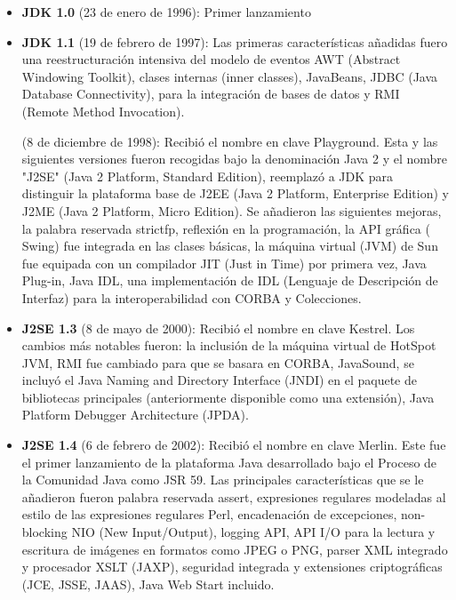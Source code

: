 \begin{itemize}

	\item \textbf{JDK 1.0}  (23 de enero de 1996): Primer lanzamiento
	
	\item \textbf{JDK 1.1} (19 de febrero de 1997): Las primeras características añadidas fuero una reestructuración intensiva del modelo de eventos AWT (Abstract Windowing Toolkit), clases internas (inner classes), JavaBeans, JDBC (Java Database Connectivity), para la integración de bases de datos y RMI (Remote Method Invocation).
	
     (8 de diciembre de 1998): Recibió el nombre en clave Playground. Esta y las siguientes versiones fueron recogidas bajo la denominación Java 2 y el nombre "J2SE" (Java 2 Platform, Standard Edition), reemplazó a JDK para distinguir la plataforma base de J2EE (Java 2 Platform, Enterprise Edition) y J2ME (Java 2 Platform, Micro Edition). 
    Se añadieron las siguientes mejoras, la palabra reservada strictfp, reflexión en la programación, la API gráfica ( Swing) fue integrada en las clases básicas, la máquina virtual (JVM) de Sun fue equipada con un compilador JIT (Just in Time) por primera vez, Java Plug-in, Java IDL, una implementación de IDL (Lenguaje de Descripción de Interfaz) para la interoperabilidad con CORBA y Colecciones.

    \item \textbf{J2SE 1.3} (8 de mayo de 2000): Recibió el nombre en clave Kestrel. Los cambios más notables fueron: la inclusión de la máquina virtual de HotSpot JVM, RMI fue cambiado para que se basara en CORBA, JavaSound, se incluyó el Java Naming and Directory Interface (JNDI) en el paquete de bibliotecas principales (anteriormente disponible como una extensión), Java Platform Debugger Architecture (JPDA).

    \item \textbf{J2SE 1.4} (6 de febrero de 2002): Recibió el nombre en clave Merlin. Este fue el primer lanzamiento de la plataforma Java desarrollado bajo el Proceso de la Comunidad Java como JSR 59. Las principales características que se le añadieron fueron palabra reservada assert, expresiones regulares modeladas al estilo de las expresiones regulares Perl, encadenación de excepciones, non-blocking NIO (New Input/Output), logging API, API I/O para la lectura y escritura de imágenes en formatos como JPEG o PNG, parser XML integrado y procesador XSLT (JAXP), seguridad integrada y extensiones criptográficas (JCE, JSSE, JAAS), Java Web Start incluido.
    

\end{itemize}

